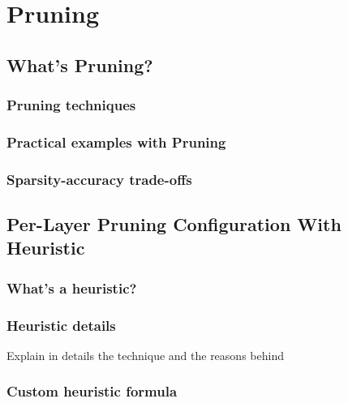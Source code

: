 \chapter{Pruning}
\lipsum[1]

\section{What's Pruning?}
\lipsum[1]

\subsection{Pruning techniques}
\lipsum[1]

\subsection{Practical examples with Pruning}
\lipsum[1]

\subsection{Sparsity-accuracy trade-offs}
\lipsum[1]

\section{Per-Layer Pruning Configuration With Heuristic}
\lipsum[1]

\subsection{What's a heuristic?}
\lipsum[1]

\subsection{Heuristic details}
Explain in details the technique and the reasons behind
\lipsum[1]

\subsection{Custom heuristic formula}
\lipsum[1]
